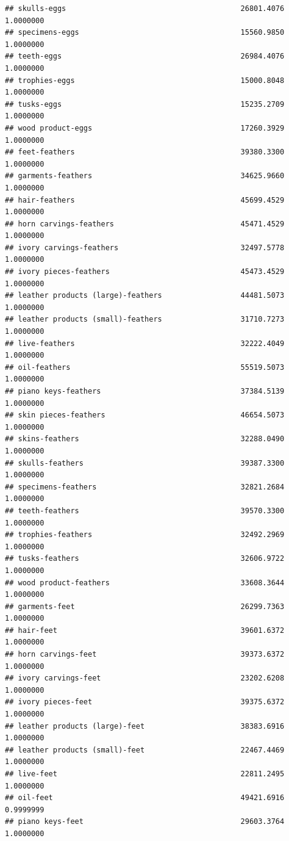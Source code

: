 \documentclass[
  12pt,
]{article}
\begin{document}
\begin{verbatim}
## skulls-eggs                                        26801.4076 1.0000000
## specimens-eggs                                     15560.9850 1.0000000
## teeth-eggs                                         26984.4076 1.0000000
## trophies-eggs                                      15000.8048 1.0000000
## tusks-eggs                                         15235.2709 1.0000000
## wood product-eggs                                  17260.3929 1.0000000
## feet-feathers                                      39380.3300 1.0000000
## garments-feathers                                  34625.9660 1.0000000
## hair-feathers                                      45699.4529 1.0000000
## horn carvings-feathers                             45471.4529 1.0000000
## ivory carvings-feathers                            32497.5778 1.0000000
## ivory pieces-feathers                              45473.4529 1.0000000
## leather products (large)-feathers                  44481.5073 1.0000000
## leather products (small)-feathers                  31710.7273 1.0000000
## live-feathers                                      32222.4049 1.0000000
## oil-feathers                                       55519.5073 1.0000000
## piano keys-feathers                                37384.5139 1.0000000
## skin pieces-feathers                               46654.5073 1.0000000
## skins-feathers                                     32288.0490 1.0000000
## skulls-feathers                                    39387.3300 1.0000000
## specimens-feathers                                 32821.2684 1.0000000
## teeth-feathers                                     39570.3300 1.0000000
## trophies-feathers                                  32492.2969 1.0000000
## tusks-feathers                                     32606.9722 1.0000000
## wood product-feathers                              33608.3644 1.0000000
## garments-feet                                      26299.7363 1.0000000
## hair-feet                                          39601.6372 1.0000000
## horn carvings-feet                                 39373.6372 1.0000000
## ivory carvings-feet                                23202.6208 1.0000000
## ivory pieces-feet                                  39375.6372 1.0000000
## leather products (large)-feet                      38383.6916 1.0000000
## leather products (small)-feet                      22467.4469 1.0000000
## live-feet                                          22811.2495 1.0000000
## oil-feet                                           49421.6916 0.9999999
## piano keys-feet                                    29603.3764 1.0000000

\end{verbatim}
\end{document}
